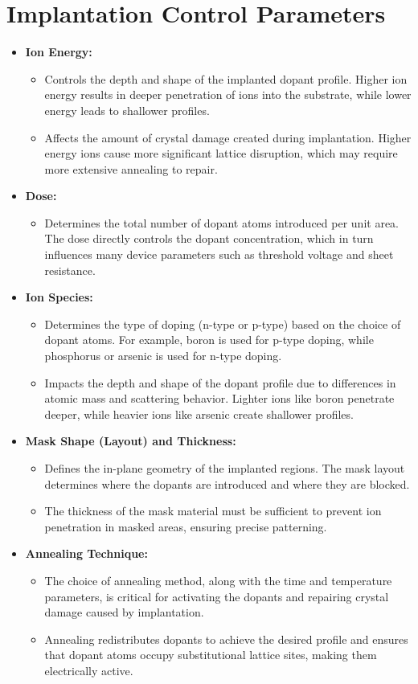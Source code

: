 \documentclass{report}
\begin{document}
\section{Implantation Control Parameters}
\begin{itemize}
    \item \textbf{Ion Energy:}
    \begin{itemize}
        \item Controls the depth and shape of the implanted dopant profile. Higher ion energy results in deeper penetration of ions into the substrate, while lower energy leads to shallower profiles.
        \item Affects the amount of crystal damage created during implantation. Higher energy ions cause more significant lattice disruption, which may require more extensive annealing to repair.
    \end{itemize}
    \item \textbf{Dose:}
    \begin{itemize}
        \item Determines the total number of dopant atoms introduced per unit area. The dose directly controls the dopant concentration, which in turn influences many device parameters such as threshold voltage and sheet resistance.
    \end{itemize}
    \item \textbf{Ion Species:}
    \begin{itemize}
        \item Determines the type of doping (n-type or p-type) based on the choice of dopant atoms. For example, boron is used for p-type doping, while phosphorus or arsenic is used for n-type doping.
        \item Impacts the depth and shape of the dopant profile due to differences in atomic mass and scattering behavior. Lighter ions like boron penetrate deeper, while heavier ions like arsenic create shallower profiles.
    \end{itemize}
    \item \textbf{Mask Shape (Layout) and Thickness:}
    \begin{itemize}
        \item Defines the in-plane geometry of the implanted regions. The mask layout determines where the dopants are introduced and where they are blocked.
        \item The thickness of the mask material must be sufficient to prevent ion penetration in masked areas, ensuring precise patterning.
    \end{itemize}
    \item \textbf{Annealing Technique:}
    \begin{itemize}
        \item The choice of annealing method, along with the time and temperature parameters, is critical for activating the dopants and repairing crystal damage caused by implantation.
        \item Annealing redistributes dopants to achieve the desired profile and ensures that dopant atoms occupy substitutional lattice sites, making them electrically active.
    \end{itemize}
\end{itemize}
\end{document}
